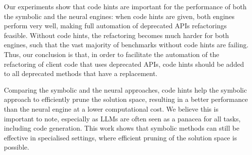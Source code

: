 \documentclass[sigconf]{acmart}
\begin{document}

Our experiments show that code hints are important for the performance of
both the symbolic and the neural engines: when code hints are given, both
engines perform very well, making full automation of deprecated APIs
refactorings feasible.  Without code hints, the refactoring becomes much
harder for both engines, such that the vast majority of benchmarks without
code hints are failing.  Thus, our conclusion is that, in order to
facilitate the automation of the refactoring of client code that uses
deprecated APIs, code hints should be added to all deprecated methods that
have a replacement.

Comparing the symbolic and the neural approaches, code hints help the
symbolic approach to efficiently prune the solution space, resulting in a
better performance than the neural engine at a lower computational cost.  We
believe this is important to note, especially as LLMs are often seen as a
panacea for all tasks, including code generation.  This work shows that
symbolic methods can still be effective in specialised settings, where
efficient pruning of the solution space is possible.
\end{document}

